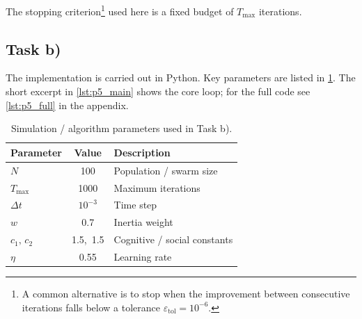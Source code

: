 The stopping criterion\footnote{A common alternative is to stop when the improvement between consecutive iterations falls below a tolerance $\varepsilon_{\text{tol}} = 10^{-6}$.} used here is a fixed budget of $T_{\max}$ iterations.

\subsection*{Task b)}
{}

The implementation is carried out in Python. Key parameters are listed in \cref{tab:params}. The short excerpt in \cref{lst:p5_main} shows the core loop; for the full code see \cref{lst:p5_full} in the appendix.

\begin{table}[htbp]
    \centering
    \caption{Simulation / algorithm parameters used in Task b).}
    \label{tab:params}
    \begin{tabular}{|l|c|l|}
        \hline
        Parameter          & Value       & Description                    \\
        \hline
        $N$                & 100         & Population / swarm size        \\
        $T_{\max}$         & 1000        & Maximum iterations             \\
        $\Delta t$         & $10^{-3}$   & Time step                      \\
        $w$                & 0.7         & Inertia weight                 \\
        $c_1,\, c_2$       & 1.5,\ 1.5  & Cognitive / social constants   \\
        $\eta$             & 0.55        & Learning rate                  \\
        \hline
    \end{tabular}
\end{table}


